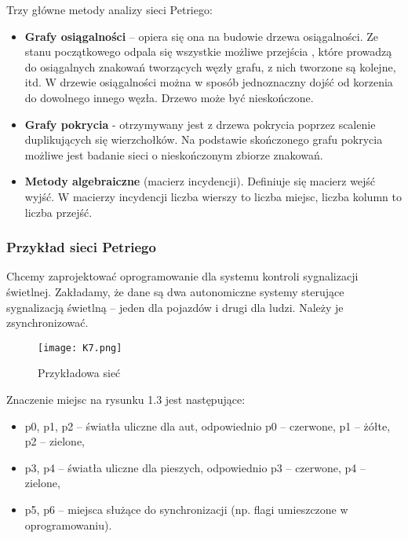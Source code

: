 Trzy główne metody analizy sieci Petriego:

\begin{itemize}
	\item \textbf{Grafy osiągalności} – opiera się ona na budowie drzewa osiągalności. Ze stanu początkowego odpala się wszystkie możliwe przejścia , które prowadzą do osiągalnych znakowań tworzących węzły grafu, z nich tworzone są kolejne, itd. W drzewie osiągalności można w sposób jednoznaczny dojść od korzenia do dowolnego innego węzła. Drzewo może być nieskończone.
	\item \textbf{Grafy pokrycia} - otrzymywany jest z drzewa pokrycia poprzez scalenie duplikujących się wierzchołków. Na podstawie skończonego grafu pokrycia możliwe jest badanie sieci o nieskończonym zbiorze znakowań.
	\item \textbf{Metody algebraiczne} (macierz incydencji). Definiuje się macierz wejść wyjść. W macierzy incydencji liczba wierszy to liczba miejsc, liczba kolumn to liczba przejść.
\end{itemize}

\subsubsection{Przykład sieci Petriego}

Chcemy zaprojektować oprogramowanie dla systemu kontroli sygnalizacji świetlnej. Zakładamy, że dane są dwa autonomiczne systemy sterujące sygnalizacją świetlną – jeden dla pojazdów i drugi dla ludzi. Należy je zsynchronizować.

\begin{figure}[H]
	\centering
	\texttt{[image: K7.png]}
	\caption{Przykładowa sieć}
\end{figure}


Znaczenie miejsc na rysunku 1.3 jest następujące:

\begin{itemize}
	\item p0, p1, p2 – światła uliczne dla aut, odpowiednio p0 – czerwone, p1 – żółte, p2 – zielone,
	\item p3, p4 – światła uliczne dla pieszych, odpowiednio p3 – czerwone, p4 – zielone,
	\item p5, p6 – miejsca służące do synchronizacji (np. flagi umieszczone w oprogramowaniu).
\end{itemize}

